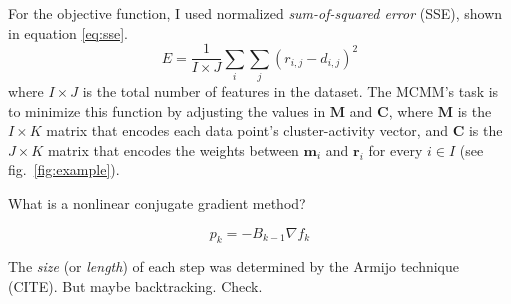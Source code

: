 For the objective function, I used normalized \emph{sum-of-squared error} (SSE), 
shown in equation \eqref{eq:sse}.
\begin{equation} \label{eq:sse}
E = \frac{1}{I \times J} \sum_{i} \sum_{j} {(r_{i,j} - d_{i,j})}^2
\end{equation}
 where $I \times J$ is the total number of features in the dataset.
The MCMM's task is to minimize this function by adjusting the
 values in $\mathbf{M}$ and $\mathbf{C}$, where
$\mathbf{M}$ is the $I \times K$ matrix that
encodes each data point's cluster-activity vector, 
and $\mathbf{C}$ is the $J \times K$ matrix that
encodes the weights between $\mathbf{m}_i$ and $\mathbf{r}_i$ for every $i \in I$ (see fig.~\ref{fig:example}). 


What is a nonlinear conjugate gradient method?

\begin{equation}
p_k = -B_{k-1}\nabla f_k
\end{equation}

The \emph{size} (or \emph{length}) of each step was determined by the 
Armijo technique (CITE).  But maybe backtracking. Check.

